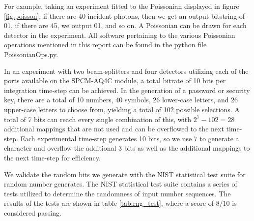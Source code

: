 \documentclass[letterpaper, 11 pt]{article}
\begin{document}
For example, taking an experiment fitted to the Poissonian displayed in figure
\ref{fig:poisson}, if there are 40 incident photons, then we get an output
bitstring of 01, if there are 45, we output 01, and so on. A Poissonian can be
drawn for each detector in the experiment. All software pertaining to the various
Poissonian operations mentioned in this report can be found in the python file PoissonianOps.py.

In an experiment with two beam-splitters and four detectors utilizing each of
the ports available on the SPCM-AQ4C module, a total bitrate of 10 bits per
integration time-step can be achieved. In the generation of a password or
security key, there are a total of 10 numbers, 40 symbols, 26 lower-case
letters, and 26 upper-case letters to choose from, yielding a total of 102
possible selections. A total of 7 bits can reach every single combination of
this, with $2^7 - 102 = 28$ additional mappings that are not used and can be
overflowed to the next time-step. Each experimental time-step generates 10 bits,
so we use 7 to generate a character and overflow the additional 3 bits as well
as the additional mappings to the next time-step for efficiency. 

We validate the random bits we generate with the NIST statistical test suite for
random number generates. The NIST statistical test suite contains a series of
tests utilized to determine the randomness of input number sequences. The
results of the tests are shown in table \ref{tab:rng_test}, where a score of
$8/10$ is considered passing.%
\end{document}
